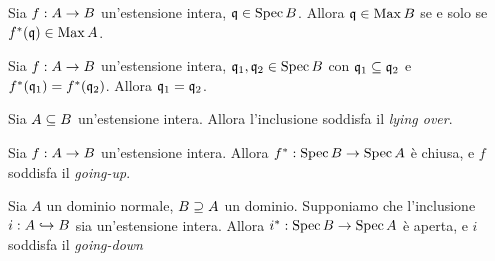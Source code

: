 \begin{corollary}
Sia $f:A\rightarrow B$ un'estensione intera, $\mathfrak{q}\in\operatorname{Spec}{B}$. Allora $\mathfrak{q}\in\operatorname{Max} B$ se e solo se $f^*(\mathfrak{q})\in\operatorname{Max} A$.
\end{corollary}
\begin{proposition}
Sia $f:A\rightarrow B$ un'estensione intera, $\mathfrak{q}_1,\mathfrak{q}_2\in\operatorname{Spec} B$ con $\mathfrak{q}_1\subseteq\mathfrak{q}_2$ e $f^*(\mathfrak{q}_1)=f^*(\mathfrak{q}_2)$. Allora $\mathfrak{q}_1=\mathfrak{q}_2$.
\end{proposition}
\begin{proposition}
Sia $A\subseteq B$ un'estensione intera. Allora l'inclusione soddisfa il \emph{lying over}.
\end{proposition}
\begin{proposition}
Sia $f:A\rightarrow B$ un'estensione intera. Allora $f^*:\operatorname{Spec} B\rightarrow \operatorname{Spec} A$ è chiusa, e $f$ soddisfa il \emph{going-up}.
\end{proposition}
\begin{proposition}
Sia $A$ un dominio normale, $B\supseteq A$ un dominio. Supponiamo che l'inclusione $i:A\hookrightarrow B$ sia un'estensione intera. Allora $i^*:\operatorname{Spec} B\rightarrow \operatorname{Spec} A$ è aperta, e $i$ soddisfa il \emph{going-down}
\end{proposition}








